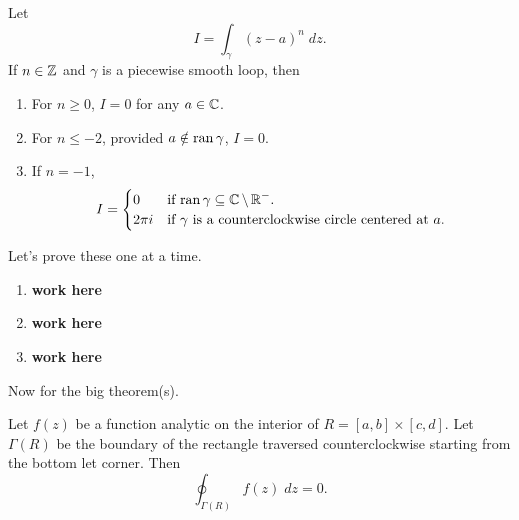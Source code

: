 \documentclass[notes]{subfile}
\begin{document}
\noindent
Let 
\[ I = \int_{\gamma} (z-a)^n \; dz. \]
If $n \in \operatorname{\mathbb{Z}}$ and $\gamma$  is a piecewise smooth loop, then
\begin{enumerate}
    \item For $n \ge 0$, $I = 0$ for any $a \in \operatorname{\mathbb{C}}$.
    \item For $n \le -2$, provided $a \notin \operatorname{ran}{\gamma}$,
        $I = 0$.
    \item If $n = -1$,
        \[ I = \begin{cases}
                0 & \text{if $\operatorname{ran}{\gamma} \subseteq \operatorname{\mathbb{C}} \setminus \operatorname{\mathbb{R}}^-$.} \\
                2\pi i & \text{if $\gamma$ is a counterclockwise circle 
                centered at $a$.}
            \end{cases}
        \]
       
\end{enumerate}

Let's prove these one at a time.

\begin{enumerate}
    \item \textbf{work here}
    \item \textbf{work here}
    \item \textbf{work here}
\end{enumerate}

Now for the big theorem(s).

\begin{theorem}
    Let $f(z)$ be a function analytic on the interior of 
    $R = [a,b] \times [c,d]$.
    Let $\Gamma(R)$ be the boundary of the rectangle traversed 
    counterclockwise starting from the bottom let corner.
    Then
    \[ \oint_{\Gamma(R)} f(z) \; dz = 0. \]
\end{theorem}
\end{document}
